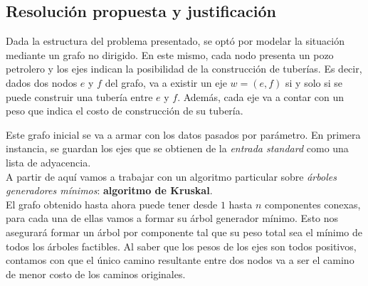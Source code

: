 \newpage

\subsection{Resoluci\'on propuesta y justificaci\'on}

Dada la estructura del problema presentado, se opt\'o por modelar la situaci\'on mediante un grafo no dirigido. En este mismo, cada nodo presenta un pozo petrolero y los ejes indican la posibilidad de la construcci\'on de tuber\'ias. Es decir, dados dos nodos $e$ y $f$ del grafo, va a existir un eje $w=(e,f)$ si y solo si se puede construir una tuber\'ia entre $e$ y $f$. Adem\'as, cada eje va a contar con un peso que indica el costo de construcci\'on de su tuber\'ia.

Este grafo inicial se va a armar con los datos pasados por par\'ametro. En primera instancia, se guardan los ejes que se obtienen de la \emph{entrada standard} como una lista de adyacencia.\\

A partir de aqu\'i vamos a trabajar con un algoritmo particular sobre \emph{\'arboles generadores m\'inimos}: \textbf{algoritmo de Kruskal}.\\

El grafo obtenido hasta ahora puede tener desde $1$ hasta $n$ componentes conexas, para cada una de ellas vamos a formar su \'arbol generador m\'inimo. Esto nos asegurar\'a formar un \'arbol por componente tal que su peso total sea el m\'inimo de todos los \'arboles factibles. Al saber que los pesos de los ejes son todos positivos, contamos con que el \'unico camino resultante entre dos nodos va a ser el camino de menor costo de los caminos originales.\\


